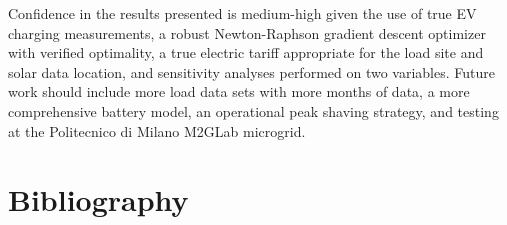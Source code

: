 \documentclass[journal,article,submit,pdftex,moreauthors]{Definitions/mdpi}
\begin{document}
Confidence in the results presented is medium-high given the use of true EV charging measurements, a robust Newton-Raphson gradient descent optimizer with verified optimality, a true electric tariff appropriate for the load site and solar data location, and sensitivity analyses performed on two variables. Future work should include more load data sets with more months of data, a more comprehensive battery model, an operational peak shaving strategy, and testing at the Politecnico di Milano M2GLab microgrid.

\section{Bibliography}\label{bibliography}%


\end{document}
